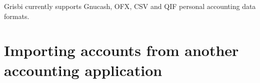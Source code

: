 


Grisbi currently supports \gls{Gnucash}, \gls{OFX}, \gls{CSV} and \gls{QIF} personal accounting data formats.


\section{Importing accounts from another accounting application\label{importexport-import}}



